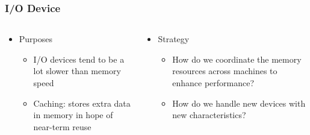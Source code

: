 \begin{frame}[t]
	\frametitle{I/O Device }
	\begin{columns}[t]
		\begin{column}{.5\textwidth}
			
			\begin{itemize}\Large
				\item Purposes
				\begin{itemize}\large
					\item I/O devices tend to be a
					lot slower than memory
					speed
					\item Caching: stores extra
					data in memory in hope
					of near-term reuse
					
				\end{itemize}
			\end{itemize}
			
		\end{column}
		
		\begin{column}{.5\textwidth}
			
			\begin{itemize}\Large
				\item Strategy
				\begin{itemize}\large
					\item How do we coordinate
					the memory resources
					across machines to
					enhance performance?
					\item How do we handle new
					devices with new
					characteristics?
				\end{itemize}
			\end{itemize}
			
		\end{column}
	\end{columns}
\end{frame}
